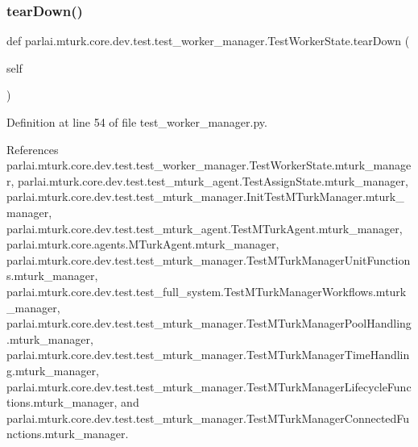 \subsubsection{\texorpdfstring{tear\+Down()}{tearDown()}}
{\footnotesize\ttfamily def parlai.\+mturk.\+core.\+dev.\+test.\+test\+\_\+worker\+\_\+manager.\+Test\+Worker\+State.\+tear\+Down (\begin{DoxyParamCaption}\item[{}]{self }\end{DoxyParamCaption})}



Definition at line 54 of file test\+\_\+worker\+\_\+manager.\+py.



References parlai.\+mturk.\+core.\+dev.\+test.\+test\+\_\+worker\+\_\+manager.\+Test\+Worker\+State.\+mturk\+\_\+manager, parlai.\+mturk.\+core.\+dev.\+test.\+test\+\_\+mturk\+\_\+agent.\+Test\+Assign\+State.\+mturk\+\_\+manager, parlai.\+mturk.\+core.\+dev.\+test.\+test\+\_\+mturk\+\_\+manager.\+Init\+Test\+M\+Turk\+Manager.\+mturk\+\_\+manager, parlai.\+mturk.\+core.\+dev.\+test.\+test\+\_\+mturk\+\_\+agent.\+Test\+M\+Turk\+Agent.\+mturk\+\_\+manager, parlai.\+mturk.\+core.\+agents.\+M\+Turk\+Agent.\+mturk\+\_\+manager, parlai.\+mturk.\+core.\+dev.\+test.\+test\+\_\+mturk\+\_\+manager.\+Test\+M\+Turk\+Manager\+Unit\+Functions.\+mturk\+\_\+manager, parlai.\+mturk.\+core.\+dev.\+test.\+test\+\_\+full\+\_\+system.\+Test\+M\+Turk\+Manager\+Workflows.\+mturk\+\_\+manager, parlai.\+mturk.\+core.\+dev.\+test.\+test\+\_\+mturk\+\_\+manager.\+Test\+M\+Turk\+Manager\+Pool\+Handling.\+mturk\+\_\+manager, parlai.\+mturk.\+core.\+dev.\+test.\+test\+\_\+mturk\+\_\+manager.\+Test\+M\+Turk\+Manager\+Time\+Handling.\+mturk\+\_\+manager, parlai.\+mturk.\+core.\+dev.\+test.\+test\+\_\+mturk\+\_\+manager.\+Test\+M\+Turk\+Manager\+Lifecycle\+Functions.\+mturk\+\_\+manager, and parlai.\+mturk.\+core.\+dev.\+test.\+test\+\_\+mturk\+\_\+manager.\+Test\+M\+Turk\+Manager\+Connected\+Functions.\+mturk\+\_\+manager.

\mbox{\label{classparlai_1_1mturk_1_1core_1_1dev_1_1test_1_1test__worker__manager_1_1TestWorkerState_afe50066a7195e71570e7d60e95ac2ada}} 
